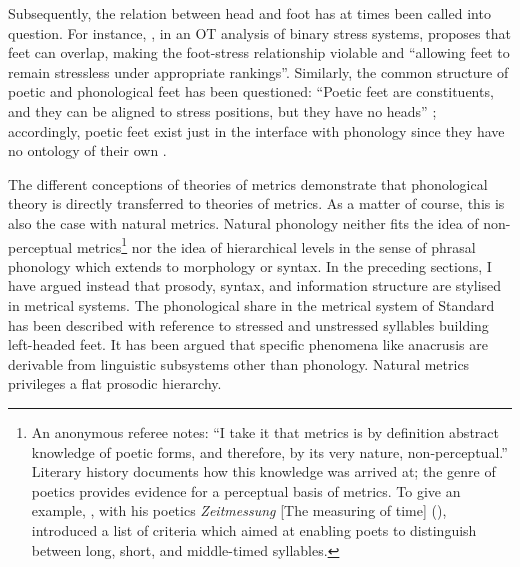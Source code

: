 \documentclass[output=paper
  ,nobabel
  ,uniformtopskip %
]{langscibook}
\begin{document}
\noindent
Subsequently, the relation between head and foot has at times been called into question. For
instance, \citet[313]{Hyde2002}, in an OT analysis of binary stress systems, proposes that feet can
overlap, making the foot-stress relationship violable and ``allowing feet to remain stressless under
appropriate rankings''. Similarly, the common structure of poetic and phonological feet has been questioned: ``Poetic feet are constituents, and they can be aligned to
stress positions, but they have no heads'' \citep[1]{VanOostendorp2017}; accordingly, poetic feet
exist just in the interface with phonology since they have no ontology of their own
\citep[11]{VanOostendorp2017}. 

The different conceptions of theories of metrics demonstrate that phonological theory is directly
transferred to theories of metrics. As a matter of course, this is also the case with natural
metrics. Natural phonology neither fits the idea of non-perceptual metrics\footnote{An anonymous
  referee notes: ``I take it that metrics is by definition abstract knowledge of poetic forms, and
  therefore, by its very nature, non-perceptual.'' Literary history documents how this knowledge was
  arrived at; the genre of poetics provides evidence for a perceptual basis of metrics. To give an
  example, \citeauthor{Voss1802}, with his poetics \emph{Zeitmessung} [The measuring of time]
  (\citeyear{Voss1802}), introduced a list of criteria which aimed at enabling poets to distinguish
  between long, short, and middle-timed syllables.} nor the idea of hierarchical levels in the sense
of phrasal phonology which extends to morphology or syntax. In the preceding sections, I have argued
instead that prosody, syntax, and information structure are stylised in metrical systems. The
phonological share in the metrical system of Standard  has been described with reference to
stressed and unstressed syllables building left-headed feet. It has been argued that specific
phenomena like anacrusis are derivable from linguistic subsystems other than phonology. Natural
metrics privileges a flat prosodic hierarchy.
\end{document}
